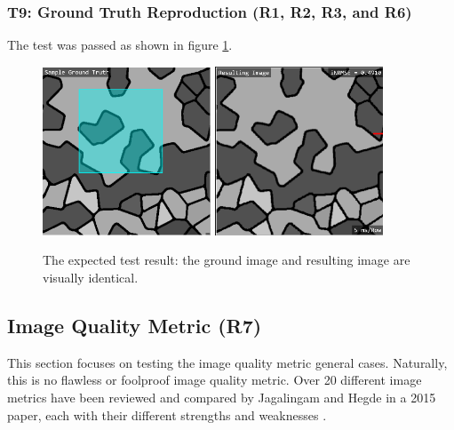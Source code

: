 \documentclass[12pt, titlepage]{article}
\begin{document}
\subsubsection{T9: Ground Truth Reproduction (R1, R2, R3, and R6)}
The test was passed as shown in figure \ref{fig_t9}.
\begin{figure}[h!]
  \begin{center}
   \includegraphics[width=5cm]{t9a.png}
   \includegraphics[width=5cm]{t9b.png}
  \caption{The expected test result: the ground image and resulting image are visually identical.}
  \label{fig_t9} 
  \end{center}
\end{figure}


\subsection{Image Quality Metric (R7)} \label{ss_metrics}
This section focuses on testing the image quality metric general cases. Naturally,
this is no flawless or foolproof image quality metric. Over 20 different image metrics have been
reviewed and compared by Jagalingam and Hegde in a 2015 paper,
each with their different strengths and weaknesses \cite{JAGALINGAM2015133}.
\end{document}
